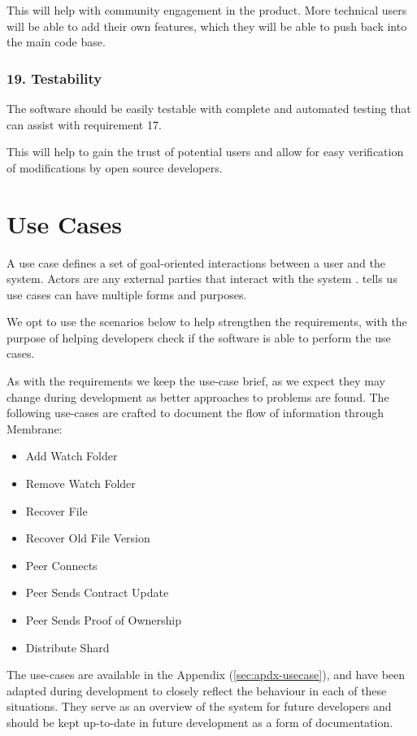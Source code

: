 \documentclass[11pt, a4paper, twoside]{report}
\begin{document}
This will help with community engagement in the product. More technical users will be able to add their own features, which they will be able to push back into the main code base.

\subsubsection{19. Testability}

The software should be easily testable with complete and automated testing that can assist with requirement 17.

This will help to gain the trust of potential users and allow for easy verification of  modifications by open source developers.

\clearpage

\section{Use Cases}

A use case defines a set of goal-oriented interactions between a user and the system. Actors are any external parties that interact with the system \citep{malan2001functional}. \cite{cockburn1997structuring} tells us use cases can have multiple forms and purposes.

We opt to use the scenarios below to help strengthen the requirements, with the purpose of helping developers check if the software is able to perform the use cases.

As with the requirements we keep the use-case brief, as we expect they may change during development as better approaches to problems are found. The following use-cases are crafted to document the flow of information through Membrane:

\begin{itemize}
 \item Add Watch Folder
 \item Remove Watch Folder
 \item Recover File
 \item Recover Old File Version
 \item Peer Connects
 \item Peer Sends Contract Update
 \item Peer Sends Proof of Ownership
 \item Distribute Shard
\end{itemize}

The use-cases are available in the Appendix (\ref{sec:apdx-usecase}), and have been adapted during development to closely reflect the behaviour in each of these situations. They serve as an overview of the system for future developers and should be kept up-to-date in future development as a form of documentation.
\end{document}
